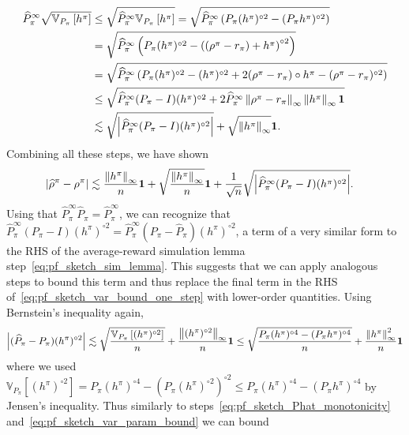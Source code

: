 \documentclass{article}
\theoremstyle{plain}
\theoremstyle{plain}
\theoremstyle{remark}
\theoremstyle{plain}
\theoremstyle{plain}
\newcommand{\Var}{\mathbb{V}}
\newcommand{\Phat}{\widehat{P}}
\newcommand{\one}{\mathbf{1}}
\newcommand{\rhohat}{\widehat{\rho}}
\begin{document}
\begin{align}
    \Phat^\infty_\pi \sqrt{\Var_{P_\pi}\left[ h^\pi\right]} &\leq \sqrt{\Phat^\infty_\pi \Var_{P_\pi}\left[ h^\pi\right]} 
    = \sqrt{\Phat^\infty_\pi \left( P_\pi (h^\pi)^{\circ 2} - (P_\pi h^\pi)^{\circ 2} \right)} \nonumber\\
    &=  \sqrt{\Phat^\infty_\pi \left( P_\pi (h^\pi)^{\circ 2} - \left((\rho^\pi - r_\pi) + h^\pi\right)^{\circ 2} \right)} \nonumber\\
    &=   \sqrt{\Phat^\infty_\pi \left( P_\pi (h^\pi)^{\circ 2} - (h^\pi)^{\circ 2} + 2(\rho^\pi - r_\pi) \circ h^{\pi} - (\rho^\pi - r_\pi)^{\circ 2} \right)} \nonumber\\
    &\leq   \sqrt{\Phat^\infty_\pi (P_\pi - I) (h^\pi)^{\circ 2}  + 2 \Phat^\infty_\pi \infnorm{\rho^\pi - r_\pi}\infnorm{h^\pi} \one } \nonumber\\
    & \lesssim \sqrt{\left|\Phat^\infty_\pi (P_\pi - I) (h^\pi)^{\circ 2} \right|}  + \sqrt{\infnorm{h^\pi}}\one \label{eq:pf_sketch_var_param_bound}.
\end{align}
Combining all these steps, we have shown
\begin{align}
    \left|\rhohat^\pi - \rho^\pi \right| & \lesssim \frac{\infnorm{h^\pi}}{n}\one + \sqrt{\frac{\infnorm{h^\pi}}{n}}\one + \frac{1}{\sqrt{n}} \sqrt{\left|\Phat^\infty_\pi (P_\pi - I) (h^\pi)^{\circ 2} \right|}. \label{eq:pf_sketch_var_bound_one_step}
\end{align}
Using that $\Phat_\pi^\infty \Phat_\pi = \Phat^\infty_\pi$, we can recognize that $\Phat^\infty_\pi (P_\pi - I) (h^\pi)^{\circ 2} = \Phat^\infty_\pi (P_\pi - \Phat_\pi) (h^\pi)^{\circ 2}$, a term of a very similar form to the RHS of the average-reward simulation lemma step~\eqref{eq:pf_sketch_sim_lemma}. This suggests that we can apply analogous steps to bound this term and thus replace the final term in the RHS of~\eqref{eq:pf_sketch_var_bound_one_step} with lower-order quantities.
Using Bernstein's inequality again,
\begin{align*}
    \left|( \Phat_\pi  - P_\pi) (h^\pi)^{\circ 2} \right| \lesssim \sqrt{\frac{\Var_{P_\pi}\left[ (h^\pi)^{\circ 2} \right]}{n}} + \frac{\infnorm{(h^\pi)^{\circ 2}}}{n} \one \leq \sqrt{\frac{ P_\pi (h^\pi)^{\circ 4} - (P_\pi h^\pi)^{\circ 4}}{n}} + \frac{\infnorm{h^\pi}^{2}}{n}\one  %
\end{align*}
where we used $\Var_{P_\pi}\left[ (h^\pi)^{\circ 2} \right] = P_\pi (h^\pi)^{\circ 4} - \left(P_\pi (h^\pi)^{\circ 2} \right)^{\circ 2} \leq P_\pi (h^\pi)^{\circ 4} - (P_\pi h^\pi)^{\circ 4}$ by Jensen's inequality. Thus similarly to steps~\eqref{eq:pf_sketch_Phat_monotonicity} and~\eqref{eq:pf_sketch_var_param_bound} we can bound
\end{document}
